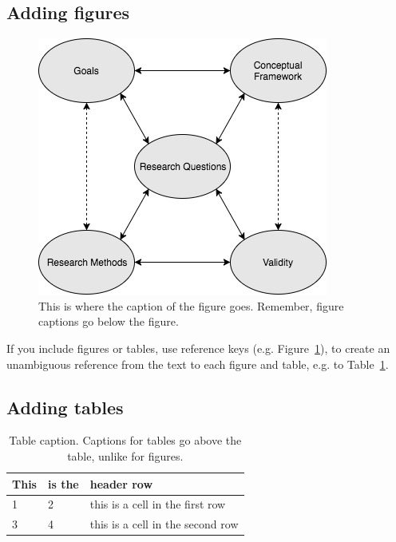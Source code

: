 \documentclass{dhbenelux}
\begin{document}
\subsection{Adding figures}

\begin{figure}
\begin{center}
\includegraphics[width=0.6\linewidth]{Images/Maxwell-conceptual-model.jpg}
\end{center}
\caption{This is where the caption of the figure goes. Remember, figure captions go below the figure.}
\label{fig:model_maxwell}
\end{figure}

If you include figures or tables, use reference keys (e.g. Figure~\ref{fig:model_maxwell}), to create an unambiguous reference from the text to each figure and table, e.g. to Table~\ref{tab:groups}.


\subsection{Adding tables}

\begin{table}[tbp!]
\centering
\caption{Table caption. Captions for tables go above the table, unlike for figures.}
\label{tab:groups}
\begin{tabular}{| l | l | l |}
\toprule
 This   & is the  & header row \\
\midrule
 1 & 2 & this is a cell in the first row \\
 3 & 4 & this is a cell in the second row \\
\bottomrule
\end{tabular}
\end{table}




\end{document}
